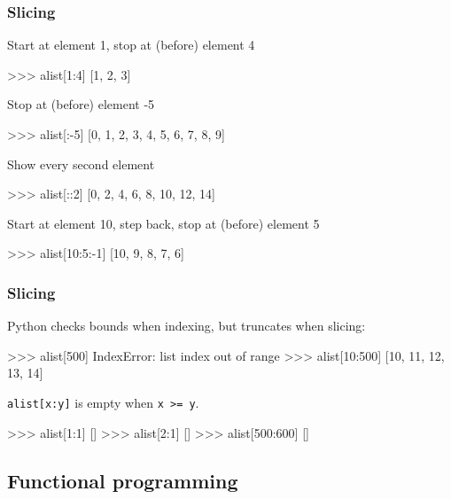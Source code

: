 \documentclass[xetex,10pt]{beamer}
\def\pythoni{\lstinline[language=pythontim]}
\def\spacer{\vspace*{1em}}
\begin{document}
\begin{frame}[fragile]
	\frametitle{Slicing}

Start at element 1, stop at (before) element 4

\begin{python}
>>> alist[1:4]
[1, 2, 3]
\end{python}

\pause
Stop at (before) element -5

\begin{python}
>>> alist[:-5]
[0, 1, 2, 3, 4, 5, 6, 7, 8, 9]
\end{python}

\pause
Show every second element

\begin{python}
>>> alist[::2]
[0, 2, 4, 6, 8, 10, 12, 14]
\end{python}

\pause
Start at element 10, step back, stop at (before) element 5 

\begin{python}
>>> alist[10:5:-1]
[10, 9, 8, 7, 6]
\end{python}

\end{frame}

\begin{frame}[fragile]
	\frametitle{Slicing}

Python checks bounds when indexing, but truncates when slicing:

\begin{python}
>>> alist[500]
IndexError: list index out of range
>>> alist[10:500]
[10, 11, 12, 13, 14]
\end{python}

	\spacer

\pause
\pythoni{alist[x:y]} is empty when \pythoni{x >= y}.

\begin{python}
>>> alist[1:1]
[]
>>> alist[2:1]
[]
>>> alist[500:600]
[]
\end{python}

\end{frame}

\subsection{Functional programming}
\end{document}
